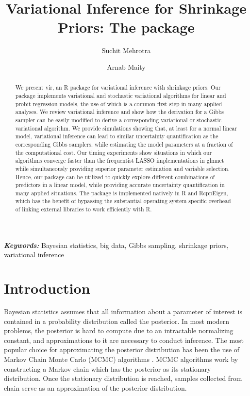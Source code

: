 \documentclass[]{article}
\title{Variational Inference for Shrinkage Priors: The \proglang{R} package 
\pkg{vir}}
\author[1]{Suchit Mehrotra}
\author[1]{Arnab Maity}
\affil[1]{Department of Statistics, North Carolina State University}
\date{}
\let\proglang=\textsf
\newcommand{\pkg}[1]{{\fontseries{b}\selectfont #1}}
\providecommand{\keywords}[1]{\textbf{\textit{Keywords:}} #1}
\begin{document}
	
\maketitle

\doublespacing

\begin{abstract} 
\noindent We present \pkg{vir}, an \proglang{R} package for variational 
inference with
shrinkage priors. Our package implements variational and stochastic variational 
algorithms for linear and probit regression models, the use of which is a 
common first step in many applied analyses. We review variational inference and 
show how the derivation for a Gibbs sampler can be easily modified to derive a 
corresponding variational or stochastic variational algorithm. We provide 
simulations showing that, at least for a normal linear model, variational inference 
can 
lead to similar uncertainty quantification as the corresponding Gibbs samplers, 
while estimating the model parameters at a fraction of the computational cost. Our 
timing experiments show situations in which our algorithms converge faster than 
the frequentist LASSO implementations in \pkg{glmnet} while simultaneously 
providing superior parameter estimation and variable selection. 
Hence, our package can be utilized to quickly explore different combinations of 
predictors in a linear model, while providing accurate uncertainty quantification in 
many applied situations.
The package is implemented natively in
\proglang{R} and \pkg{RcppEigen}, which has the benefit of bypassing the
substantial operating system specific overhead of linking external libraries to
work efficiently with \proglang{R}.
\end{abstract}

\keywords{Bayesian statistics, big data, Gibbs sampling, shrinkage priors, 
variational inference}

\section{Introduction} \label{sec:vir:intro}

Bayesian statistics assumes that all information about a parameter of interest
is contained in a probability distribution called the posterior. In most modern
problems, the posterior is hard to compute due to an intractable normalizing
constant, and approximations to it are necessary to conduct inference. The most
popular choice for approximating the posterior distribution has been the use of
Markov Chain Monte Carlo (MCMC) algorithms \citep{robert2013monte}.  MCMC
algorithms work by constructing a Markov chain which has the posterior as its
stationary distribution. Once the stationary distribution is reached, samples
collected from chain serve as an approximation of the posterior distribution. 
\end{document}

